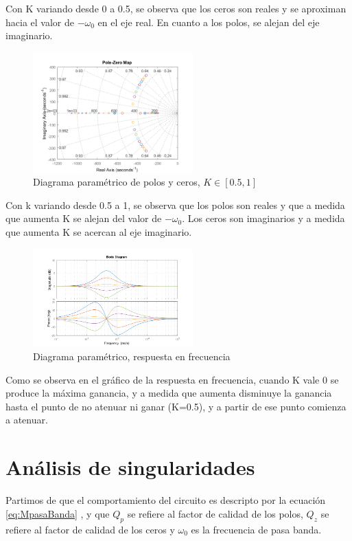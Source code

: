 \documentclass[../../tc_tp3_main.tex]{subfiles}
\begin{document}
Con K variando desde 0 a 0.5, se observa que los ceros son reales y se aproximan hacia el valor de $-\omega_0$ en el eje real. En cuanto a los polos, se alejan del eje imaginario. 


\begin{figure}[H]
\centering
\includegraphics[width=0.55\textwidth]{imagenes/param051.png}
\caption{Diagrama param\'etrico de polos y ceros, $K\in [0.5,1]$} 
\end{figure}


Con k variando desde 0.5 a 1, se observa que los polos son reales y que a medida que aumenta K se alejan del valor de $-\omega_0$. Los ceros son imaginarios y a medida que aumenta K se acercan al eje imaginario.


\begin{figure}[H]
\centering
\includegraphics[width=0.55\textwidth]{imagenes/paramBode.png}
\caption{Diagrama param\'etrico, respuesta en frecuencia} 
\end{figure}

Como se observa en el gráfico de la respuesta en frecuencia, cuando K vale 0 se produce la máxima ganancia, y a medida que aumenta disminuye la ganancia hasta el punto de no atenuar ni ganar (K=0.5), y a partir de ese punto comienza a atenuar.

\section{Análisis de singularidades}

Partimos de que el comportamiento del circuito es descripto por la ecuación \ref{eq:MpasaBanda} , y que $Q_p$ se refiere al factor de calidad de los polos, $Q_z$ se refiere al factor de calidad de los ceros y $\omega_0$ es la frecuencia de pasa banda.
\end{document}
